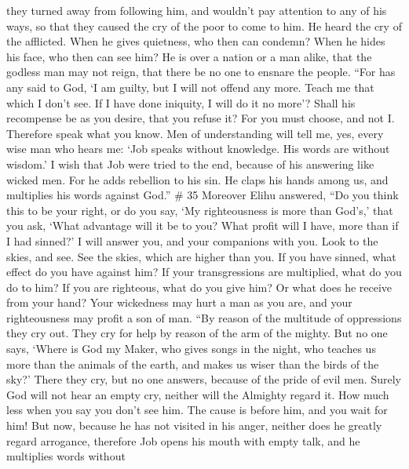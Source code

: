 they turned away from following him, and wouldn't pay attention to any
of his ways,  so that they caused the cry of the poor to
come to him. He heard the cry of the afflicted.  When he
gives quietness, who then can condemn? When he hides his face, who then
can see him? He is over a nation or a man alike,  that the
godless man may not reign, that there be no one to ensnare the people.
 ``For has any said to God, `I am guilty, but I will not
offend any more.  Teach me that which I don't see. If I
have done iniquity, I will do it no more'?  Shall his
recompense be as you desire, that you refuse it? For you must choose,
and not I. Therefore speak what you know.  Men of
understanding will tell me, yes, every wise man who hears me:
 `Job speaks without knowledge. His words are without
wisdom.'  I wish that Job were tried to the end, because of
his answering like wicked men.  For he adds rebellion to
his sin. He claps his hands among us, and multiplies his words against
God.'' \# 35  Moreover Elihu answered,  ``Do you
think this to be your right, or do you say, `My righteousness is more
than God's,'  that you ask, `What advantage will it be to
you? What profit will I have, more than if I had sinned?'  I
will answer you, and your companions with you.  Look to the
skies, and see. See the skies, which are higher than you. 
If you have sinned, what effect do you have against him? If your
transgressions are multiplied, what do you do to him?  If
you are righteous, what do you give him? Or what does he receive from
your hand?  Your wickedness may hurt a man as you are, and
your righteousness may profit a son of man.  ``By reason of
the multitude of oppressions they cry out. They cry for help by reason
of the arm of the mighty.  But no one says, `Where is God
my Maker, who gives songs in the night,  who teaches us
more than the animals of the earth, and makes us wiser than the birds of
the sky?'  There they cry, but no one answers, because of
the pride of evil men.  Surely God will not hear an empty
cry, neither will the Almighty regard it.  How much less
when you say you don't see him. The cause is before him, and you wait
for him!  But now, because he has not visited in his anger,
neither does he greatly regard arrogance,  therefore Job
opens his mouth with empty talk, and he multiplies words without
